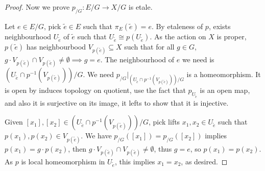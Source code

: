 \documentclass[a4paper]{article}
\begin{document}
\begin{proof}
    Now we prove $p_{/G}:E/G\to X/G$ is etale. 

    Let $e\in E/G$, pick $\tilde{e}\in E$ such that $\pi_E(\tilde{e})=e$. By etaleness of $p$, exists neighbourhood  $U_{\tilde{e}}$ of $\tilde{e}$ such that $U_{\tilde{e}}\cong p(U_{\tilde{e}})$. As the action on $X$ is proper, $p(\tilde{e})$ has neighbourbood $V_{p(\tilde{e})}\subseteq X$ such that for all $g\in G$, $g\cdot V_{p(\tilde{e})}\cap V_{p(\tilde{e})}\ne\emptyset \implies g = e$. The neighbourhood of $e$ we need is $(U_{\tilde{e}}\cap p^{-1}(V_{p(\tilde{e})}))/G$. We need $p_{/G}|_{(U_{\tilde{e}}\cap p^{-1}(V_{p(\tilde{e})}))/G}$ is a homeomorphism. It is open by induces topology on quotient, use the fact that $p_{U_{\tilde{e}}}$ is an open map, and also it is surjective on its image, it lefts to show that it is injective. 

    Given $[x_1],[x_2]\in (U_{\tilde{e}}\cap p^{-1}(V_{p(\tilde{e})}))/G$, pick lifts $x_1,x_2\in U_{\tilde{e}}$ such that $p(x_1),p(x_2)\in V_{p(\tilde{e})}$. We have $p_{/G}([x_1])=p_{/G}([x_2])$ implies $p(x_1)=g\cdot p(x_2)$, then $g\cdot V_{p(\tilde{e})}\cap V_{p(\tilde{e})}\ne\emptyset$, thus $g=e$, so $p(x_1)=p(x_2)$. As $p$ is local homeomorphism in $U_{\tilde{e}}$, this implies $x_1=x_2$, as desired.






\end{proof}
\end{document}
